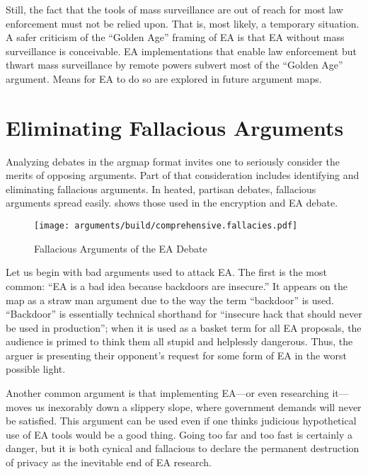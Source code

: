 Still, the fact that the tools of mass surveillance are out of reach for most law enforcement must not be relied upon.
That is, most likely, a temporary situation. A safer criticism of the ``Golden Age'' framing of \ac{EA} is that \ac{EA}
without mass surveillance is conceivable. \ac{EA} implementations that enable law enforcement but thwart mass
surveillance by remote powers subvert most of the ``Golden Age'' argument. Means for \ac{EA} to do so are explored in
future argument maps.


\section{Eliminating Fallacious Arguments}

Analyzing debates in the \ac{argmap} format invites one to seriously consider the merits of opposing arguments. Part of
that consideration includes identifying and eliminating fallacious arguments. In heated, partisan debates, fallacious
arguments spread easily.  shows those used in the encryption and \ac{EA} debate.

\begin{figure}[h]
  \centering\CaptionFontSize
  \texttt{[image: arguments/build/comprehensive.fallacies.pdf]}
  \caption{Fallacious Arguments of the EA Debate}
  \label{fig-arg-fallacies}
\end{figure}

Let us begin with bad arguments used to attack \ac{EA}. The first is the most common: ``\ac{EA} is a bad idea because
backdoors are insecure.'' It appears on the map as a straw man argument due to the way the term ``backdoor'' is used.
``Backdoor'' is essentially technical shorthand for ``insecure hack that should never be used in production''; when it
is used as a basket term for all \ac{EA} proposals, the audience is primed to think them all stupid and helplessly
dangerous. Thus, the arguer is presenting their opponent's request for some form of \ac{EA} in the worst possible light.

Another common argument is that implementing \ac{EA}---or even researching it---moves us inexorably down a slippery
slope, where government demands will never be satisfied. This argument can be used even if one thinks judicious
hypothetical use of \ac{EA} tools would be a good thing. Going too far and too fast is certainly a danger, but it is
both cynical and fallacious to declare the permanent destruction of privacy as the inevitable end of \ac{EA} research.

